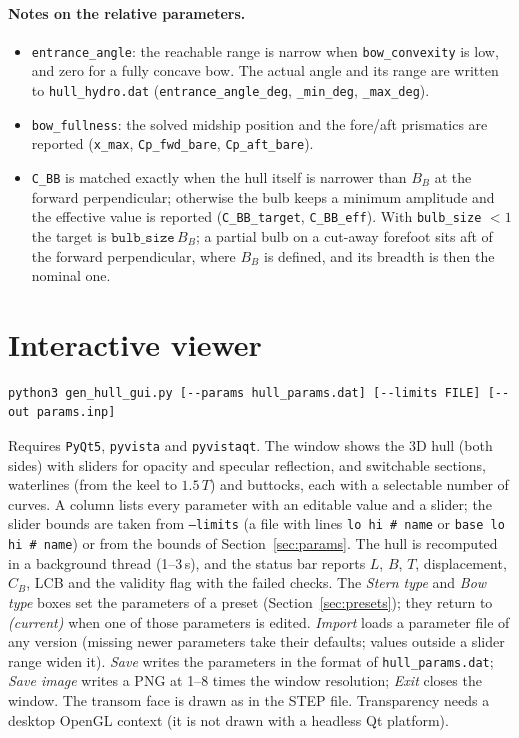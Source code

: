 \documentclass[11pt,a4paper]{article}
\newcommand{\cmd}[1]{\texttt{#1}}
\begin{document}
\paragraph{Notes on the relative parameters.}
\begin{itemize}
\item \cmd{entrance\_angle}: the reachable range is narrow when \cmd{bow\_convexity} is low, and
  zero for a fully concave bow. The actual angle and its range are written to
  \cmd{hull\_hydro.dat} (\cmd{entrance\_angle\_deg}, \cmd{\_min\_deg}, \cmd{\_max\_deg}).
\item \cmd{bow\_fullness}: the solved midship position and the fore/aft prismatics are reported
  (\cmd{x\_max}, \cmd{Cp\_fwd\_bare}, \cmd{Cp\_aft\_bare}).
\item \cmd{C\_BB} is matched exactly when the hull itself is narrower than $B_B$ at the forward
  perpendicular; otherwise the bulb keeps a minimum amplitude and the effective value is
  reported (\cmd{C\_BB\_target}, \cmd{C\_BB\_eff}). With \cmd{bulb\_size} $<1$ the target is
  $\cmd{bulb\_size}\,B_B$; a partial bulb on a cut-away forefoot sits aft of the forward
  perpendicular, where $B_B$ is defined, and its breadth is then the nominal one.
\end{itemize}

\section{Interactive viewer}
\begin{lstlisting}
python3 gen_hull_gui.py [--params hull_params.dat] [--limits FILE] [--out params.inp]
\end{lstlisting}
Requires \cmd{PyQt5}, \cmd{pyvista} and \cmd{pyvistaqt}. The window shows the 3D hull (both sides)
with sliders for opacity and specular reflection, and switchable sections, waterlines (from the
keel to $1.5\,T$) and buttocks, each with a selectable number of curves. A column lists every
parameter with an editable value and a slider; the slider bounds are taken from \cmd{--limits}
(a file with lines \cmd{lo hi \# name} or \cmd{base lo hi \# name}) or from the bounds of
Section~\ref{sec:params}. The hull is recomputed in a background thread (1--3\,s), and the
status bar reports $L$, $B$, $T$, displacement, $C_B$, LCB and the validity flag with the failed
checks. The \emph{Stern type} and \emph{Bow type} boxes set the parameters of a preset
(Section~\ref{sec:presets}); they return to \emph{(current)} when one of those parameters is
edited. \emph{Import} loads a parameter file of any version (missing newer parameters take their
defaults; values outside a slider range widen it). \emph{Save} writes the parameters in the
format of \cmd{hull\_params.dat}; \emph{Save image} writes a PNG at 1--8 times the window
resolution; \emph{Exit} closes the window. The transom face is drawn as in the STEP file.
Transparency needs a desktop OpenGL context (it is not drawn with a headless Qt platform).
\end{document}

